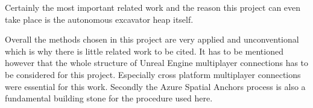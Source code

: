 
Certainly the most important related work and the reason this project can even take place is the autonomous excavator heap\citep*{heap} itself. 

Overall the methods chosen in this project are very applied and unconventional which is why there is little related work to be cited. It has to be mentioned however that the whole structure of Unreal Engine multiplayer connections has to be considered for this project. Especially cross platform multiplayer connections were essential for this work. Secondly the Azure Spatial Anchors process is also a fundamental building stone for the procedure used here.